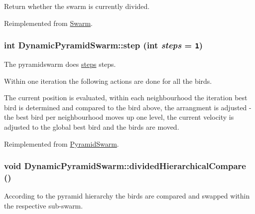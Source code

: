 Return whether the swarm is currently divided. 



Reimplemented from \hyperlink{classSwarm_75d0b85dc6fa2ec069f1580e0386faee}{Swarm}.\hypertarget{classDynamicPyramidSwarm_ffcde6a425fd052c0bd5a65124a204a1}{
\subsubsection{\setlength{\rightskip}{0pt plus 5cm}int DynamicPyramidSwarm::step (int {\em steps} = {\tt 1})}}
\label{classDynamicPyramidSwarm_ffcde6a425fd052c0bd5a65124a204a1}


The pyramidswarm does \hyperlink{runpso_8cpp_b4ae7205573977222eadd0795db193e2}{steps} steps. 

Within one iteration the following actions are done for all the birds.\par
 The current position is evaluated, within each neighbourhood the iteration best bird is determined and compared to the bird above, the arrangment is adjusted - the best bird per neighbourhood moves up one level, the current velocity is adjusted to the global best bird and the birds are moved. 

Reimplemented from \hyperlink{classPyramidSwarm_a9a21f0581b43dc3549fee12d6f2229e}{PyramidSwarm}.\hypertarget{classDynamicPyramidSwarm_22575508717d5555be45f05efaa8ee3e}{
\subsubsection{\setlength{\rightskip}{0pt plus 5cm}void DynamicPyramidSwarm::dividedHierarchicalCompare ()}}
\label{classDynamicPyramidSwarm_22575508717d5555be45f05efaa8ee3e}


According to the pyramid hierarchy the birds are compared and swapped within the respective sub-swarm. 

